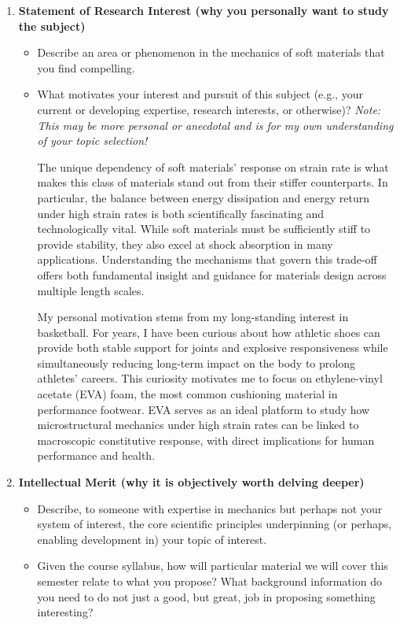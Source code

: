 \begin{enumerate}
\item \textbf{Statement of Research Interest (why you personally want to study the subject)}
\begin{itemize}
\item Describe an area or phenomenon in the mechanics of soft materials that you find compelling.
\item What motivates your interest and pursuit of this subject (e.g., your current or developing expertise, research interests, or otherwise)? \textit{Note: This may be more personal or anecdotal and is for my own understanding of your topic selection!}

The unique dependency of soft materials’ response on strain rate is what makes this class of materials stand out from their stiffer counterparts. In particular, the balance between energy dissipation and energy return under high strain rates is both scientifically fascinating and technologically vital. While soft materials must be sufficiently stiff to provide stability, they also excel at shock absorption in many applications. Understanding the mechanisms that govern this trade-off offers both fundamental insight and guidance for materials design across multiple length scales.

My personal motivation stems from my long-standing interest in basketball. For years, I have been curious about how athletic shoes can provide both stable support for joints and explosive responsiveness while simultaneously reducing long-term impact on the body to prolong athletes’ careers. This curiosity motivates me to focus on ethylene-vinyl acetate (EVA) foam, the most common cushioning material in performance footwear. EVA serves as an ideal platform to study how microstructural mechanics under high strain rates can be linked to macroscopic constitutive response, with direct implications for human performance and health.
\end{itemize}
\item \textbf{Intellectual Merit (why it is objectively worth delving deeper)}
\begin{itemize}
\item Describe, to someone with expertise in mechanics but perhaps not your system of interest, the core scientific principles underpinning (or perhaps, enabling development in) your topic of interest.
\item Given the course syllabus, how will particular material we will cover this semester relate to what you propose? What background information do you need to do not just a good, but great, job in proposing something interesting?


\end{itemize}
\end{enumerate}
